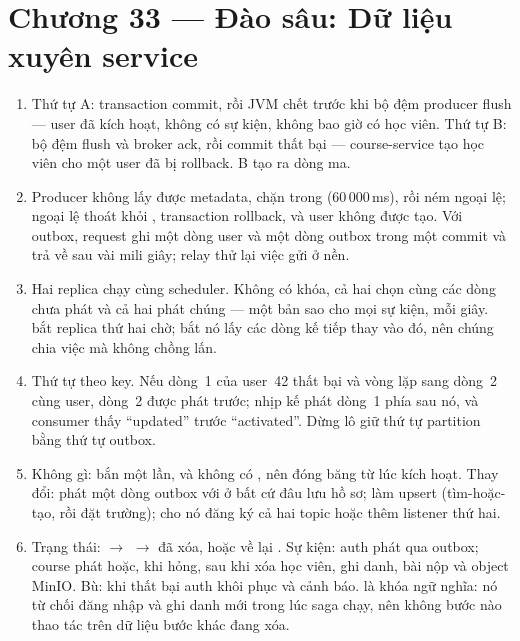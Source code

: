 \section*{Chương 33 --- Đào sâu: Dữ liệu xuyên service}
\begin{enumerate}
  \item Thứ tự A: transaction commit, rồi JVM chết trước khi bộ đệm
  producer flush --- user đã kích hoạt, không có sự kiện, không bao giờ
  có học viên. Thứ tự B: bộ đệm flush và broker ack, rồi commit thất
  bại --- course-service tạo học viên cho một user đã bị rollback. B
  tạo ra dòng ma.
  \item Producer không lấy được metadata, chặn trong
   (60\,000\,ms), rồi ném ngoại lệ; ngoại lệ thoát
  khỏi , transaction rollback, và user không được tạo.
  Với outbox, request ghi một dòng user và một dòng outbox trong một
  commit và trả về sau vài mili giây; relay thử lại việc gửi ở nền.
  \item Hai replica chạy cùng scheduler. Không có khóa, cả hai chọn
  cùng các dòng chưa phát và cả hai phát chúng --- một bản sao cho mọi
  sự kiện, mỗi giây.  bắt replica thứ hai chờ;
   bắt nó lấy các dòng kế tiếp thay vào đó, nên chúng
  chia việc mà không chồng lấn.
  \item Thứ tự theo key. Nếu dòng~1 của user~42 thất bại và vòng lặp
   sang dòng~2 cùng user, dòng~2 được phát trước; nhịp
  kế phát dòng~1 phía sau nó, và consumer thấy ``updated'' trước
  ``activated''. Dừng lô giữ thứ tự partition bằng thứ tự outbox.
  \item Không gì:  bắn một lần, và không có
  , nên  đóng băng từ lúc
  kích hoạt. Thay đổi: phát một dòng outbox với
   ở bất cứ đâu lưu hồ sơ; làm
   upsert (tìm-hoặc-tạo, rồi đặt trường);
  cho nó đăng ký cả hai topic hoặc thêm listener thứ hai.
  \item Trạng thái:  $\rightarrow$ 
  $\rightarrow$ đã xóa, hoặc về lại . Sự kiện: auth phát
   qua outbox; course phát
   hoặc, khi hỏng,
   sau khi xóa học viên, ghi danh, bài
  nộp và object MinIO. Bù: khi
  thất bại auth khôi phục  và cảnh báo.  là
  khóa ngữ nghĩa: nó từ chối đăng nhập và ghi danh mới trong lúc saga
  chạy, nên không bước nào thao tác trên dữ liệu bước khác đang xóa.
\end{enumerate}


